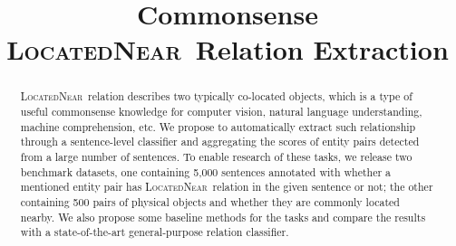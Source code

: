 \documentclass[11pt]{article}
\newcommand{\lnear}{\textsc{LocatedNear}}
\begin{document}
	\title{Commonsense \lnear~Relation Extraction}
	\maketitle
\begin{abstract}
	\lnear~relation describes two typically co-located objects, 
	which is a type of useful commonsense knowledge for 
	computer vision, natural language understanding, machine comprehension, etc. 
	We propose to automatically extract such relationship through
	a sentence-level classifier and aggregating the scores of
	entity pairs detected from a large number of sentences.
	To enable research of these tasks, we release two benchmark datasets, 
	one containing 5,000 sentences annotated with whether a mentioned entity pair has \lnear~relation in the given sentence or not; 
	the other containing 500 pairs of physical objects and whether they are 
	commonly located nearby.
	We also propose some baseline methods for the tasks and compare the results with a state-of-the-art general-purpose relation classifier.
\end{abstract}















\end{document}
